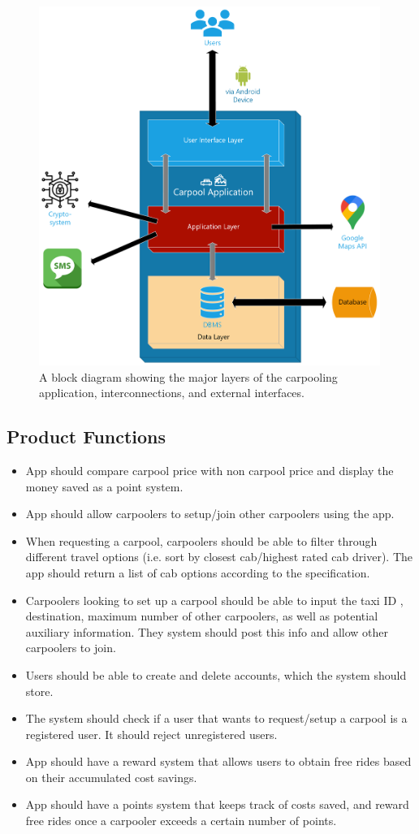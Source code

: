 \documentclass[]{article}
\begin{document}
\begin{figure}[h!]
	\centering
	\includegraphics[width=30em]{ProductPerspectiveBlockDiagram.png}
	\caption{A block diagram showing the major layers of the carpooling application, interconnections, and external interfaces.}
	\label{fig:blockdiagram}
\end{figure}

\subsection{Product Functions}
\label{sub:product_functions}
\begin{itemize}
	\item App should compare carpool price with non carpool price and display the money saved as a point system.
	\item App should allow carpoolers to setup/join other carpoolers using the app.
	\item When requesting a carpool, carpoolers should be able to filter through different travel options (i.e. sort by closest cab/highest rated cab driver). The app should return a list of cab options according to the specification.
	\item Carpoolers looking to set up a carpool should be able to input the taxi ID , destination, maximum number of other carpoolers, as well as potential auxiliary information. They system should post this info and allow other carpoolers to join.
	\item Users should be able to create and delete accounts, which the system should store.
	\item The system should check if a user that wants to request/setup a carpool is a registered user. It should reject unregistered users.
	\item App should have a reward system that allows users to obtain free rides based on their accumulated cost savings.
	\item App should have a points system that keeps track of costs saved, and reward free rides once a carpooler exceeds a certain number of points.
\end{itemize}
\end{document}
